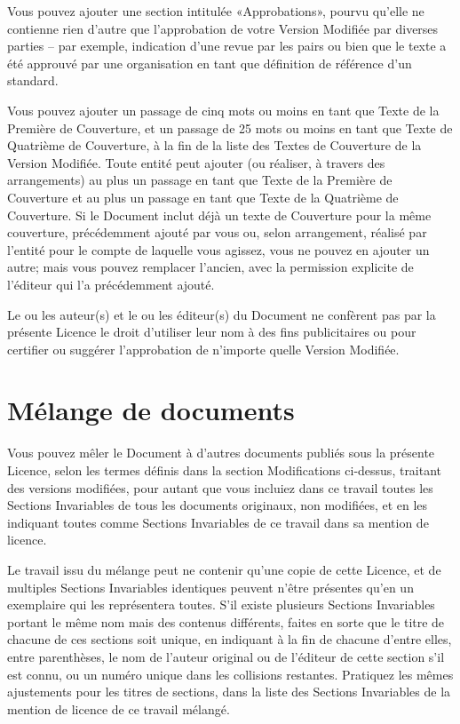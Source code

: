 Vous pouvez ajouter une section intitulée «Approbations»,
pourvu qu'elle ne contienne rien d'autre que l'approbation de votre
Version Modifiée par diverses parties -- par exemple, indication d'une
revue par les pairs ou bien que le texte a été approuvé par une organisation
en tant que définition de référence d'un standard. 

Vous pouvez ajouter un passage de cinq mots ou moins en
tant que Texte de la Première de Couverture, et un passage de 25 mots
ou moins en tant que Texte de Quatrième de Couverture, à la fin de
la liste des Textes de Couverture de la Version Modifiée. Toute entité
peut ajouter (ou réaliser, à travers des arrangements) au plus un
passage en tant que Texte de la Première de Couverture et au plus
un passage en tant que Texte de la Quatrième de Couverture. Si le
Document inclut déjà un texte de Couverture pour la même couverture,
précédemment ajouté par vous ou, selon arrangement, réalisé par l'entité
pour le compte de laquelle vous agissez, vous ne pouvez en ajouter
un autre; mais vous pouvez remplacer l'ancien, avec la permission
explicite de l'éditeur qui l'a précédemment ajouté. 

Le ou les auteur(s) et le ou les éditeur(s) du Document
ne confèrent pas par la présente Licence le droit d'utiliser leur
nom à des fins publicitaires ou pour certifier ou suggérer l'approbation
de n'importe quelle Version Modifiée. 


\section{Mélange de documents} 

Vous pouvez mêler le Document à d'autres documents publiés
sous la présente Licence, selon les termes définis dans la section
Modifications ci-dessus, traitant des versions modifiées, pour autant
que vous incluiez dans ce travail toutes les Sections Invariables
de tous les documents originaux, non modifiées, et en les indiquant
toutes comme Sections Invariables de ce travail dans sa mention de
licence. 

Le travail issu du mélange peut ne contenir qu'une copie
de cette Licence, et de multiples Sections Invariables identiques
peuvent n'être présentes qu'en un exemplaire qui les représentera
toutes. S'il existe plusieurs Sections Invariables portant le même
nom mais des contenus différents, faites en sorte que le titre de
chacune de ces sections soit unique, en indiquant à la fin de chacune
d'entre elles, entre parenthèses, le nom de l'auteur original ou de
l'éditeur de cette section s'il est connu, ou un numéro unique dans
les collisions restantes. Pratiquez les mêmes ajustements pour les
titres de sections, dans la liste des Sections Invariables de la mention
de licence de ce travail mélangé. 


